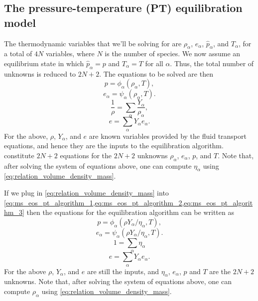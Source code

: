 \documentclass[oneside,a4paper,11pt]{report}
\begin{document}
\subsection{The pressure-temperature (PT) equilibration model}
The thermodynamic variables that we'll be solving for are $\rho_\alpha$, $e_\alpha$, $\hat{p}_\alpha$, and $T_\alpha$, for a total of $4N$ variables, where $N$ is the number of species. We now assume an equilibrium state in which $\hat{p}_\alpha = p$ and $T_\alpha = T$ for all $\alpha$. Thus, the total number of unknowns is reduced to $2N+2$. The equations to be solved are then
\begin{equation}
    \label{eq:ms_eos_pt_algorithm_1}
    p = \phi_\alpha (\rho_\alpha, T),
\end{equation}
\begin{equation}
    \label{eq:ms_eos_pt_algorithm_2}
    e_\alpha = \psi_\alpha (\rho_\alpha, T).
\end{equation}
\begin{equation}
    \label{eq:ms_eos_pt_algorithm_3}
    \frac{1}{\rho} = \sum_\alpha \frac{Y_\alpha}{\rho_\alpha},
\end{equation}
\begin{equation}
    \label{eq:ms_eos_pt_algorithm_4}
    e = \sum_\alpha Y_\alpha e_\alpha.
\end{equation}
For the above, $\rho$, $Y_\alpha$, and $e$ are known variables provided by the fluid transport equations, and hence they are the inputs to the equilibration algorithm.  constitute $2N+2$ equations for the $2N+2$ unknowns $\rho_\alpha$, $e_\alpha$, $p$, and $T$. Note that, after solving the system of equations above, one can compute $\eta_\alpha$ using \cref{eq:relation_volume_density_mass}.

If we plug in \cref{eq:relation_volume_density_mass} into \cref{eq:ms_eos_pt_algorithm_1,eq:ms_eos_pt_algorithm_2,eq:ms_eos_pt_algorithm_3} then the equations for the equilibration algorithm can be written as 
\begin{equation}
    p = \phi_\alpha (\rho Y_\alpha / \eta_\alpha, T),
\end{equation}
\begin{equation}
    e_\alpha = \psi_\alpha (\rho Y_\alpha / \eta_\alpha, T).
\end{equation}
\begin{equation}
    1 = \sum_\alpha \eta_\alpha
\end{equation}
\begin{equation}
    e = \sum_\alpha Y_\alpha e_\alpha.
\end{equation}
For the above $\rho$, $Y_\alpha$, and $e$ are still the inputs, and $\eta_\alpha$, $e_\alpha$, $p$ and $T$ are the $2N+2$ unknowns. Note that, after solving the system of equations above, one can compute $\rho_\alpha$ using \cref{eq:relation_volume_density_mass}.
\end{document}

